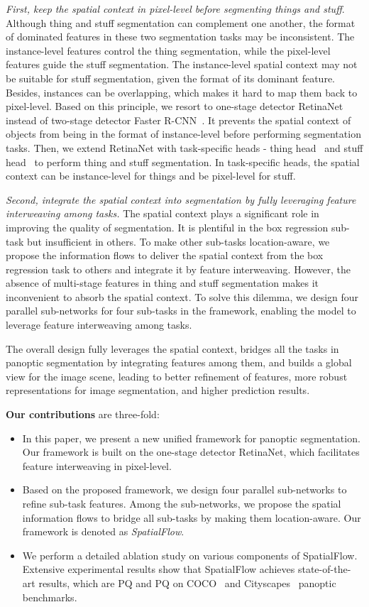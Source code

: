 \documentclass[journal,final]{IEEEtran}
\begin{document}
{\em First, keep the spatial context in pixel-level before segmenting things and stuff}. Although thing and stuff segmentation can complement one another, the format of dominated features in these two segmentation tasks may be inconsistent. The instance-level features control the thing segmentation, while the pixel-level features guide the stuff segmentation. The instance-level spatial context may not be suitable for stuff segmentation, given the format of its dominant feature. Besides, instances can be overlapping, which makes it hard to map them back to pixel-level. Based on this principle, we resort to one-stage detector RetinaNet~\cite{retinanet} instead of two-stage detector Faster R-CNN~\cite{fasterrcnn}. It prevents the spatial context of objects from being in the format of instance-level before performing segmentation tasks. Then, we extend RetinaNet with task-specific heads - thing head~\cite{retinamask} and stuff head~\cite{panopticfpn} to perform thing and stuff segmentation. In task-specific heads, the spatial context can be instance-level for things and be pixel-level for stuff.

{\em Second, integrate the spatial context into segmentation by fully leveraging feature interweaving among tasks.} The spatial context plays a significant role in improving the quality of segmentation. It is plentiful in the box regression sub-task but insufficient in others. To make other sub-tasks location-aware, we propose the information flows to deliver the spatial context from the box regression task to others and integrate it by feature interweaving. However, the absence of multi-stage features in thing and stuff segmentation makes it inconvenient to absorb the spatial context. To solve this dilemma, we design four parallel sub-networks for four sub-tasks in the framework, enabling the model to leverage feature interweaving among tasks.

The overall design fully leverages the spatial context, bridges all the tasks in panoptic segmentation by integrating features among them, and builds a global view for the image scene, leading to better refinement of features, more robust representations for image segmentation, and higher prediction results.



\textbf{Our contributions} are three-fold:
\begin{itemize}
\item In this paper, we present a new unified framework for panoptic segmentation. Our framework is built on the one-stage detector RetinaNet, which facilitates feature interweaving in pixel-level. 
\item Based on the proposed framework, we design four parallel sub-networks to refine sub-task features. Among the sub-networks, we propose the spatial information flows to bridge all sub-tasks by making them location-aware. Our framework is denoted as {\em SpatialFlow}. 
\item We perform a detailed ablation study on various components of SpatialFlow. Extensive experimental results show that SpatialFlow achieves state-of-the-art results, which are  PQ and  PQ on COCO~\cite{coco} and Cityscapes~\cite{cityscapes} panoptic benchmarks.
\end{itemize}
\end{document}
